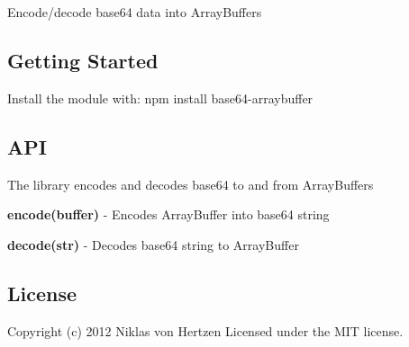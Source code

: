 \href{https://travis-ci.org/niklasvh/base64-arraybuffer}{\tt } \href{https://www.npmjs.org/package/base64-arraybuffer}{\tt } \href{https://www.npmjs.org/package/base64-arraybuffer}{\tt }

Encode/decode base64 data into Array\+Buffers

\subsection*{Getting Started}

Install the module with\+: {\ttfamily npm install base64-\/arraybuffer}

\subsection*{A\+PI}

The library encodes and decodes base64 to and from Array\+Buffers


\begin{DoxyItemize}
\item {\bfseries encode(buffer)} -\/ Encodes {\ttfamily Array\+Buffer} into base64 string
\item {\bfseries decode(str)} -\/ Decodes base64 string to {\ttfamily Array\+Buffer}
\end{DoxyItemize}

\subsection*{License}

Copyright (c) 2012 Niklas von Hertzen Licensed under the M\+IT license. 